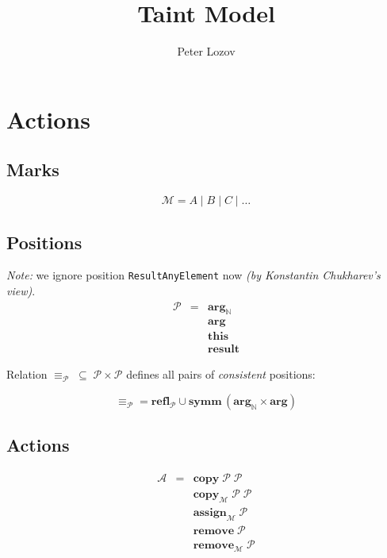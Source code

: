 \documentclass{article}
\title{Taint Model}
\author{Peter Lozov}
\date{}
\newcommand{\primi}[1]{\mathbf{#1}}
\newcommand{\pEquiv}{\equiv_{\scriptscriptstyle{\mathcal{P}}}}
\begin{document}
\maketitle

\section{Actions}

\subsection{Marks}

\[
\mathcal{M} = A \mid B \mid C \mid \ldots
\]

\subsection{Positions}

\noindent \textit{Note:} we ignore position \texttt{ResultAnyElement} now \textit{(by Konstantin Chukharev's view)}.
\[
\begin{array}{rcl}
\mathcal{P} & = & \primi{arg}_\mathbb{N} \\
            &   & \primi{arg} \\
            &   & \primi{this} \\
            &   & \primi{result}
\end{array}
\]

\noindent Relation $\pEquiv\;\subseteq\;\mathcal{P}\times\mathcal{P}$ defines all pairs of \emph{consistent} positions:

\[
  \pEquiv = \primi{refl}_\mathcal{P} \cup \primi{symm}\,(\primi{arg}_{\mathbb{N}}\times\primi{arg})
\]

\subsection{Actions}

\[
\begin{array}{rcl}
\mathcal{A} & = & \primi{copy}\;\mathcal{P}\;\mathcal{P} \\
            &   & \primi{copy}_\mathcal{M}\;\mathcal{P}\;\mathcal{P} \\
            &   & \primi{assign}_\mathcal{M}\;\mathcal{P} \\
            &   & \primi{remove}\;\mathcal{P}\\
            &   & \primi{remove}_\mathcal{M}\;\mathcal{P}
\end{array}
\]
\end{document}
